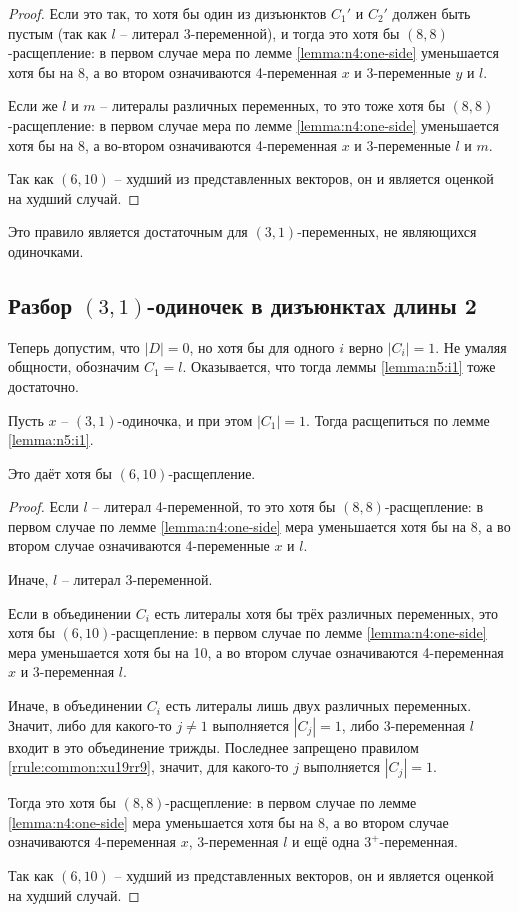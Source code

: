 \begin{proof}
 Если это так, то хотя бы один из дизъюнктов $C_1'$ и $C_2'$ должен быть пустым (так как $l$ -- литерал 3-переменной), и тогда это хотя бы $(8,8)$-расщепление: в первом случае мера по лемме \ref{lemma:n4:one-side} уменьшается хотя бы на 8, а во втором означиваются 4-переменная $x$ и 3-переменные $y$ и $l$.

 Если же $l$ и $m$ -- литералы различных переменных, то это тоже хотя бы $(8,8)$-расщепление: в первом случае мера по лемме \ref{lemma:n4:one-side} уменьшается хотя бы на 8, а во-втором означиваются 4-переменная $x$ и 3-переменные $l$ и $m$.

 Так как $(6,10)$ -- худший из представленных векторов, он и является оценкой на худший случай.
\end{proof}

Это правило является достаточным для $(3,1)$-переменных, не являющихся одиночками.

\subsection{Разбор $(3,1)$-одиночек в дизъюнктах длины 2}
\label{subsec:n4:31-2c}

Теперь допустим, что $|D| = 0$, но хотя бы для одного $i$ верно $|C_i| = 1$.
Не умаляя общности, обозначим $C_1 = l$.
Оказывается, что тогда леммы \ref{lemma:n5:i1} тоже достаточно.

\begin{brule}
 Пусть $x$ -- $(3,1)$-одиночка, и при этом $|C_1| = 1$.
 Тогда расщепиться по лемме \ref{lemma:n5:i1}.

 Это даёт хотя бы $(6,10)$-расщепление.
 \label{brule:n4:31-2c}
\end{brule}

\begin{proof}
 Если $l$ -- литерал 4-переменной, то это хотя бы $(8,8)$-расщепление: в первом случае по лемме \ref{lemma:n4:one-side} мера уменьшается хотя бы на 8, а во втором случае означиваются 4-переменные $x$ и $l$.

 Иначе, $l$ -- литерал 3-переменной.

 Если в объединении $C_i$ есть литералы хотя бы трёх различных переменных, это хотя бы $(6,10)$-расщепление: в первом случае по лемме \ref{lemma:n4:one-side} мера уменьшается хотя бы на 10, а во втором случае означиваются 4-переменная $x$ и 3-переменная $l$.

 Иначе, в объединении $C_i$ есть литералы лишь двух различных переменных.
 Значит, либо для какого-то $j \neq 1$ выполняется $|C_j| = 1$, либо 3-переменная $l$ входит в это объединение трижды. Последнее запрещено правилом \ref{rrule:common:xu19rr9}, значит, для какого-то $j$ выполняется $|C_j| = 1$.

 Тогда это хотя бы $(8,8)$-расщепление: в первом случае по лемме \ref{lemma:n4:one-side} мера уменьшается хотя бы на 8, а во втором случае означиваются 4-переменная $x$, 3-переменная $l$ и ещё одна $3^+$-переменная.

 Так как $(6,10)$ -- худший из представленных векторов, он и является оценкой на худший случай.
\end{proof}

